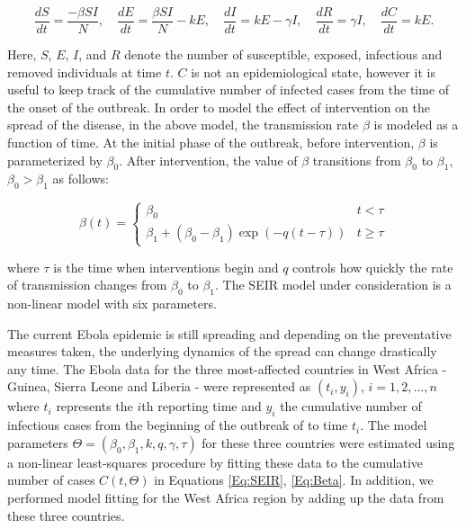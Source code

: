 \documentclass[10pt, journal,onecolumn]{IEEEtran}
\begin{document}
\begin{equation}
\dfrac{dS}{dt}	=	\dfrac{-\beta SI}{N},
\quad
\dfrac{dE}{dt}	=	\dfrac{\beta SI}{N}-kE,
\quad
\dfrac{dI}{dt}	=	kE-\gamma I,
\quad
\dfrac{dR}{dt}	=	\gamma I,
\quad
\dfrac{dC}{dt}	=	kE.
\label{Eq:SEIR}
\end{equation}

Here, $S$, $E$, $I$, and $R$ denote the number of susceptible, exposed, infectious and removed
individuals at time $t$. $C$ is not an epidemiological state, however it is useful to keep track of
the cumulative number of infected cases from the time of the onset of the outbreak. In order to
model the effect of intervention on the spread of the disease, in the above model, the transmission
rate $\beta$ is modeled as a function of time. At the initial phase of the outbreak, before
intervention, $\beta$ is parameterized by $\beta_0$. After intervention, the value of $\beta$
transitions from $\beta_0$ to $\beta_1$, $\beta_0>\beta_1$ as follows:

\begin{equation}
\beta(t)=\begin{cases}
\beta_{0} & t<\tau\\
\beta_{1}+(\beta_{0}-\beta_{1})\exp\left(-q\left(t-\tau\right)\right) & t\ge\tau
\end{cases}
\label{Eq:Beta}
\end{equation}

\noindent where $\tau$ is the time when interventions begin and $q$ controls how quickly the rate of
transmission changes from $\beta_0$ to $\beta_1$. The SEIR model under consideration is a non-linear
model with six parameters.

The current Ebola epidemic is still spreading and depending on the preventative measures  taken, the
underlying dynamics of the spread can change drastically any time. The Ebola data for the three
most-affected countries in West Africa - Guinea, Sierra Leone and Liberia - were represented as $(t_i,y_i)$,
$i=1,2,\ldots,n$ where $t_i$ represents the $i$th reporting time and $y_i$ the cumulative number of
infectious cases from the beginning of the outbreak of to time $t_i$.  The model parameters
$\Theta=(\beta_0,\beta_1,k,q,\gamma, \tau)$ for these three countries were estimated using a
non-linear least-squares procedure by fitting these data to the cumulative number of cases
$C(t,\Theta)$ in Equations \eqref{Eq:SEIR}, \eqref{Eq:Beta}. In addition, we performed model fitting
for the West Africa region by adding up the data from these three countries.
\end{document}

